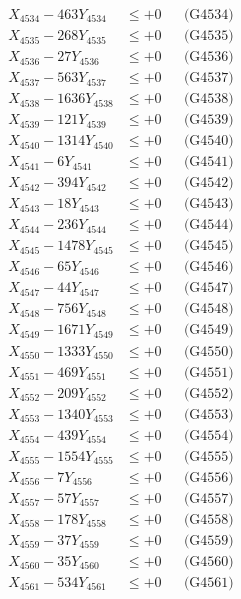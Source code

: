 \documentclass[a4paper,10pt]{article}
\begin{document}
{\begin{align}
X_{4534} - 463Y_{4534} &\leq +0 && \text{(G4534)} \\
X_{4535} - 268Y_{4535} &\leq +0 && \text{(G4535)} \\
X_{4536} - 27Y_{4536} &\leq +0 && \text{(G4536)} \\
X_{4537} - 563Y_{4537} &\leq +0 && \text{(G4537)} \\
X_{4538} - 1636Y_{4538} &\leq +0 && \text{(G4538)} \\
X_{4539} - 121Y_{4539} &\leq +0 && \text{(G4539)} \\
X_{4540} - 1314Y_{4540} &\leq +0 && \text{(G4540)} \\
\allowbreak
X_{4541} - 6Y_{4541} &\leq +0 && \text{(G4541)} \\
X_{4542} - 394Y_{4542} &\leq +0 && \text{(G4542)} \\
X_{4543} - 18Y_{4543} &\leq +0 && \text{(G4543)} \\
X_{4544} - 236Y_{4544} &\leq +0 && \text{(G4544)} \\
X_{4545} - 1478Y_{4545} &\leq +0 && \text{(G4545)} \\
X_{4546} - 65Y_{4546} &\leq +0 && \text{(G4546)} \\
X_{4547} - 44Y_{4547} &\leq +0 && \text{(G4547)} \\
X_{4548} - 756Y_{4548} &\leq +0 && \text{(G4548)} \\
X_{4549} - 1671Y_{4549} &\leq +0 && \text{(G4549)} \\
X_{4550} - 1333Y_{4550} &\leq +0 && \text{(G4550)} \\
\allowbreak
X_{4551} - 469Y_{4551} &\leq +0 && \text{(G4551)} \\
X_{4552} - 209Y_{4552} &\leq +0 && \text{(G4552)} \\
X_{4553} - 1340Y_{4553} &\leq +0 && \text{(G4553)} \\
X_{4554} - 439Y_{4554} &\leq +0 && \text{(G4554)} \\
X_{4555} - 1554Y_{4555} &\leq +0 && \text{(G4555)} \\
X_{4556} - 7Y_{4556} &\leq +0 && \text{(G4556)} \\
X_{4557} - 57Y_{4557} &\leq +0 && \text{(G4557)} \\
X_{4558} - 178Y_{4558} &\leq +0 && \text{(G4558)} \\
X_{4559} - 37Y_{4559} &\leq +0 && \text{(G4559)} \\
X_{4560} - 35Y_{4560} &\leq +0 && \text{(G4560)} \\
\allowbreak
X_{4561} - 534Y_{4561} &\leq +0 && \text{(G4561)} \\

\end{align}}
\end{document}
